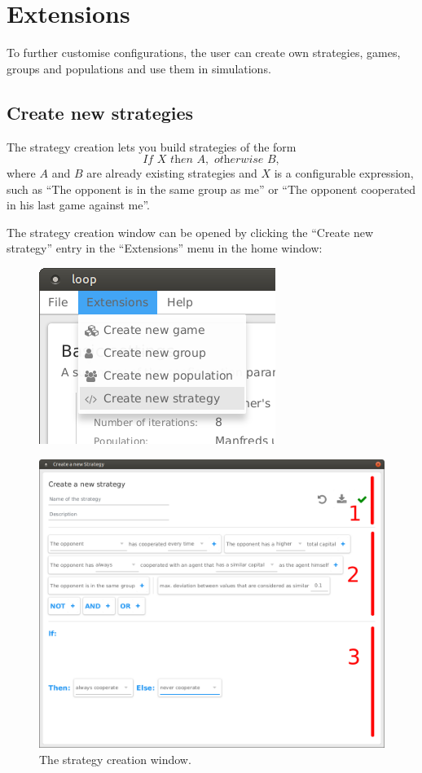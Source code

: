\documentclass[parskip=full,11pt]{scrartcl}
\begin{document}
\section{Extensions}

To further customise configurations, the user can create own strategies, games, groups and populations and use them in simulations.

\subsection{Create new strategies}
The strategy creation lets you build strategies of the form
\begin{equation}
\textit{If } X \textit{ then } A, \textit{ otherwise } B,
\end{equation}\label{eq:strategy}
where \(A\) and \(B\) are already existing strategies and \(X\) is a configurable expression, such as \enquote{The opponent is in the same group as me} or \enquote{The opponent cooperated in his last game against me}.

The strategy creation window can be opened by clicking the \enquote{Create new strategy} entry in the \enquote{Extensions} menu in the home window:

\begin{figure}[h]
	\centering
	\includegraphics[width=0.2\linewidth]{img_manual/strategy_menu.png}
\end{figure}

\begin{figure}
	\centering
	\includegraphics[width=0.8\linewidth]{img_manual/strategy_window.png}
	\caption{The strategy creation window.}
	\label{fig:strategy_window}
\end{figure}
\end{document}
